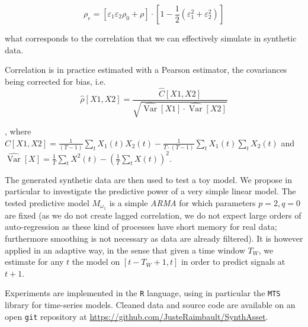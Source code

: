 \documentclass{article}
\DeclareMathOperator{\Var}{Var}
\begin{document}
\begin{equation}
\label{eq:eff_corr}
\rho_e = \left[ \varepsilon_1 \varepsilon_2 \rho_0 + \rho \right] \cdot \left[ 1 - \frac{1}{2}\left(\varepsilon_1^2 + \varepsilon_2^2 \right) \right]
\end{equation}

{\noindent}what corresponds to the correlation that we can effectively simulate in synthetic data.

Correlation is in practice estimated with a Pearson estimator, the covariances being corrected for bias, i.e.
\[
\hat{\rho}[X1,X2] = \frac{\hat{C}[X1,X2]}{\sqrt{\hat{\Var{}}[X1] \cdot \hat{\Var{}}[X2]}}
\]

, where $\hat{C}[X1,X2] = \frac{1}{(T-1)}\sum_{t} X_1(t)X_2(t) - \frac{1}{T\cdot (T-1)} \sum_t X_1(t) \sum_t X_2(t)$ and $\hat{\Var{}}[X] = \frac{1}{T}\sum_t{X^2(t)}-\left(\frac{1}{T}\sum_tX(t)\right)^2$.


The generated synthetic data are then used to test a toy model. We propose in particular to investigate the predictive power of a very simple linear model. The tested predictive model $M_{\omega_1}$ is a simple \emph{ARMA} for which parameters $p=2,q=0$ are fixed (as we do not create lagged correlation, we do not expect large orders of auto-regression as these kind of processes have short memory for real data; furthermore smoothing is not necessary as data are already filtered). It is however applied in an adaptive way, in the sense that given a time window $T_W$, we estimate for any $t$ the model on $[t-T_W+1,t]$ in order to predict signals at $t+1$.




Experiments are implemented in the \texttt{R} language, using in particular the \texttt{MTS}~\cite{Tsay:2015xy} library for time-series models. Cleaned data and source code are available on an open \texttt{git} repository at \url{https://github.com/JusteRaimbault/SynthAsset}.
\end{document}

